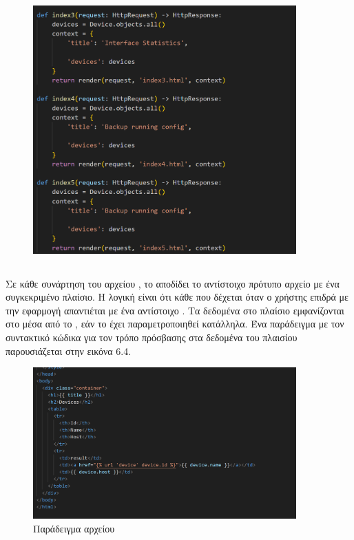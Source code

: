 \FloatBarrier

\begin{figure}[htb]
	\centering
	\includegraphics[width=0.9\textwidth]{graphics/viewspy.png}
	\caption{ }
\end{figure}

\FloatBarrier

\subsection{}


Σε κάθε συνάρτηση του αρχείου , το  αποδίδει το αντίστοιχο πρότυπο 
αρχείο με ένα συγκεκριμένο πλαίσιο. Η λογική είναι ότι κάθε  που δέχεται όταν ο χρήστης επιδρά με την εφαρμογή απαντιέται με ένα αντίστοιχο  . Τα δεδομένα στο πλαίσιο εμφανίζονται
στο  μέσα από το , εάν το  έχει παραμετροποιηθεί κατάλληλα. Ένα παράδειγμα  με
τον συντακτικό κώδικα για τον τρόπο πρόσβασης στα δεδομένα του πλαισίου παρουσιάζεται στην εικόνα 6.4.

\FloatBarrier

\begin{figure}[htb]
	\centering
	\includegraphics[width=0.9\textwidth]{graphics/html_template.png}
	\caption{Παράδειγμα  αρχείου }
\end{figure}

